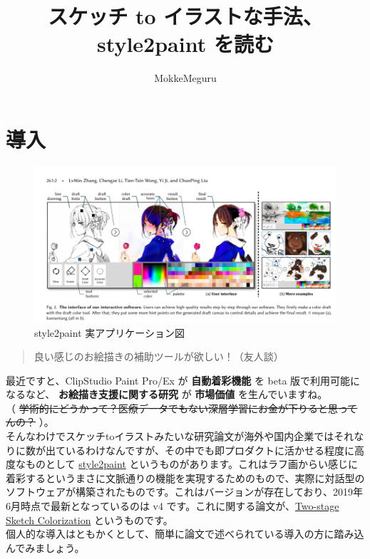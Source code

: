 \documentclass[a4paper, dvipdfmx, 10pt]{article}
\author{MokkeMeguru}
\date{}
\title{スケッチ to イラストな手法、style2paint を読む}
\begin{document}
\maketitle
\section{導入}
\label{sec:org3193845}
\begin{figure}[htbp]
\centering
\includegraphics[width=.9\linewidth]{./img/style2paint_app.PNG}
\caption{style2paint 実アプリケーション図}
\end{figure}

\begin{quote}
良い感じのお絵描きの補助ツールが欲しい！（友人談）\\
\end{quote}

  最近ですと、ClipStudio Paint Pro/Ex が \textbf{自動着彩機能} を beta 版で利用可能になるなど、 \textbf{お絵描き支援に関する研究} が \textbf{市場価値} を生んでいますね。\\
（ \sout{学術的にどうかって？医療データでもない深層学習にお金が下りると思ってんの？} ）。\\

そんなわけでスケッチtoイラストみたいな研究論文が海外や国内企業ではそれなりに数が出ているわけなんですが、その中でも即プロダクトに活かせる程度に高度なものとして \href{https://github.com/lllyasviel/style2paints}{style2paint} というものがあります。これはラフ画からい感じに着彩するというまさに文脈通りの機能を実現するためのもので、実際に対話型のソフトウェアが構築されたものです。これはバージョンが存在しており、2019年6月時点で最新となっているのは v4 です。これに関する論文が、\href{https://github.com/lllyasviel/style2paints/blob/master/papers/sa.pdf}{Two-stage Sketch Colorization} というものです。\\

個人的な導入はともかくとして、簡単に論文で述べられている導入の方に踏み込んでみましょう。\\
\end{document}
